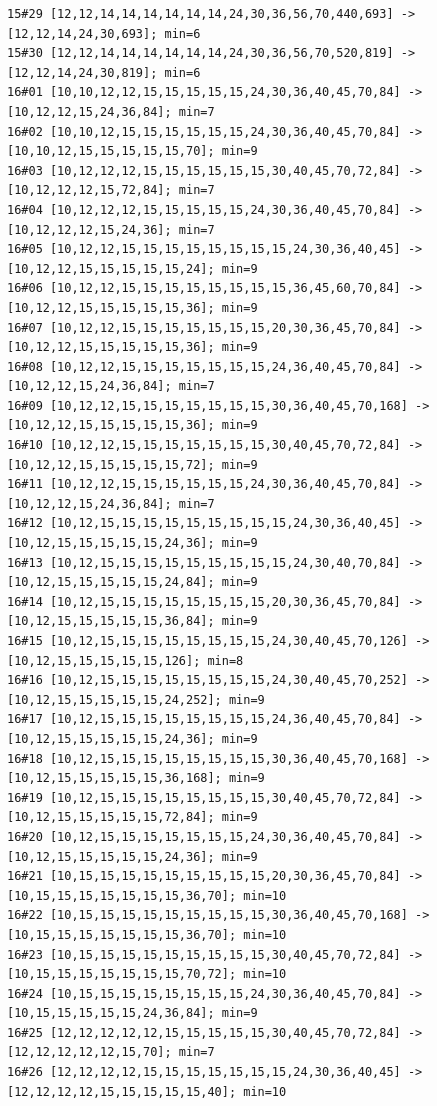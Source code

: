 \documentclass[11pt,a4paper]{article}
\begin{document}
\begin{Verbatim}[breaklines,breakanywhere,fontsize=\footnotesize]
15#29 [12,12,14,14,14,14,14,14,24,30,36,56,70,440,693] -> [12,12,14,24,30,693]; min=6
15#30 [12,12,14,14,14,14,14,14,24,30,36,56,70,520,819] -> [12,12,14,24,30,819]; min=6
16#01 [10,10,12,12,15,15,15,15,15,24,30,36,40,45,70,84] -> [10,12,12,15,24,36,84]; min=7
16#02 [10,10,12,15,15,15,15,15,15,24,30,36,40,45,70,84] -> [10,10,12,15,15,15,15,15,70]; min=9
16#03 [10,12,12,12,15,15,15,15,15,15,30,40,45,70,72,84] -> [10,12,12,12,15,72,84]; min=7
16#04 [10,12,12,12,15,15,15,15,15,24,30,36,40,45,70,84] -> [10,12,12,12,15,24,36]; min=7
16#05 [10,12,12,15,15,15,15,15,15,15,15,24,30,36,40,45] -> [10,12,12,15,15,15,15,15,24]; min=9
16#06 [10,12,12,15,15,15,15,15,15,15,15,36,45,60,70,84] -> [10,12,12,15,15,15,15,15,36]; min=9
16#07 [10,12,12,15,15,15,15,15,15,15,20,30,36,45,70,84] -> [10,12,12,15,15,15,15,15,36]; min=9
16#08 [10,12,12,15,15,15,15,15,15,15,24,36,40,45,70,84] -> [10,12,12,15,24,36,84]; min=7
16#09 [10,12,12,15,15,15,15,15,15,15,30,36,40,45,70,168] -> [10,12,12,15,15,15,15,15,36]; min=9
16#10 [10,12,12,15,15,15,15,15,15,15,30,40,45,70,72,84] -> [10,12,12,15,15,15,15,15,72]; min=9
16#11 [10,12,12,15,15,15,15,15,15,24,30,36,40,45,70,84] -> [10,12,12,15,24,36,84]; min=7
16#12 [10,12,15,15,15,15,15,15,15,15,15,24,30,36,40,45] -> [10,12,15,15,15,15,15,24,36]; min=9
16#13 [10,12,15,15,15,15,15,15,15,15,15,24,30,40,70,84] -> [10,12,15,15,15,15,15,24,84]; min=9
16#14 [10,12,15,15,15,15,15,15,15,15,20,30,36,45,70,84] -> [10,12,15,15,15,15,15,36,84]; min=9
16#15 [10,12,15,15,15,15,15,15,15,15,24,30,40,45,70,126] -> [10,12,15,15,15,15,15,126]; min=8
16#16 [10,12,15,15,15,15,15,15,15,15,24,30,40,45,70,252] -> [10,12,15,15,15,15,15,24,252]; min=9
16#17 [10,12,15,15,15,15,15,15,15,15,24,36,40,45,70,84] -> [10,12,15,15,15,15,15,24,36]; min=9
16#18 [10,12,15,15,15,15,15,15,15,15,30,36,40,45,70,168] -> [10,12,15,15,15,15,15,36,168]; min=9
16#19 [10,12,15,15,15,15,15,15,15,15,30,40,45,70,72,84] -> [10,12,15,15,15,15,15,72,84]; min=9
16#20 [10,12,15,15,15,15,15,15,15,24,30,36,40,45,70,84] -> [10,12,15,15,15,15,15,24,36]; min=9
16#21 [10,15,15,15,15,15,15,15,15,15,20,30,36,45,70,84] -> [10,15,15,15,15,15,15,15,36,70]; min=10
16#22 [10,15,15,15,15,15,15,15,15,15,30,36,40,45,70,168] -> [10,15,15,15,15,15,15,15,36,70]; min=10
16#23 [10,15,15,15,15,15,15,15,15,15,30,40,45,70,72,84] -> [10,15,15,15,15,15,15,15,70,72]; min=10
16#24 [10,15,15,15,15,15,15,15,15,24,30,36,40,45,70,84] -> [10,15,15,15,15,15,24,36,84]; min=9
16#25 [12,12,12,12,12,15,15,15,15,15,30,40,45,70,72,84] -> [12,12,12,12,12,15,70]; min=7
16#26 [12,12,12,12,15,15,15,15,15,15,15,24,30,36,40,45] -> [12,12,12,12,15,15,15,15,15,40]; min=10

\end{Verbatim}
\end{document}
